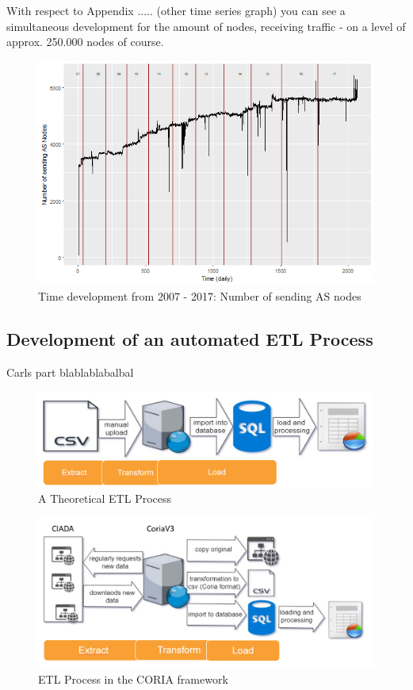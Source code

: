 \documentclass[conference]{IEEEtran}
\begin{document}
With respect to Appendix ..... (other time series graph) you can see a simultaneous development for the amount of nodes, receiving traffic - on a level of approx. 250.000 nodes of course. 




\begin{figure}[htbp]
\centerline{\includegraphics[scale=0.4]{Graphics/ASFromAll.png}}
\caption{Time development from 2007 - 2017: Number of sending AS nodes}
\label{fig}
\end{figure}


\subsection{Development of an automated ETL Process}

Carls part blablablabalbal



\begin{figure}[htbp]
\centerline{\includegraphics[scale=0.29]{Graphics/ETL1.PNG}}
\caption{A Theoretical ETL Process}
\label{fig}
\end{figure}

\begin{figure}[htbp]
\centerline{\includegraphics[scale=0.4]{Graphics/ETL2.PNG}}
\caption{ETL Process in the CORIA framework}
\label{fig}
\end{figure}
\end{document}

